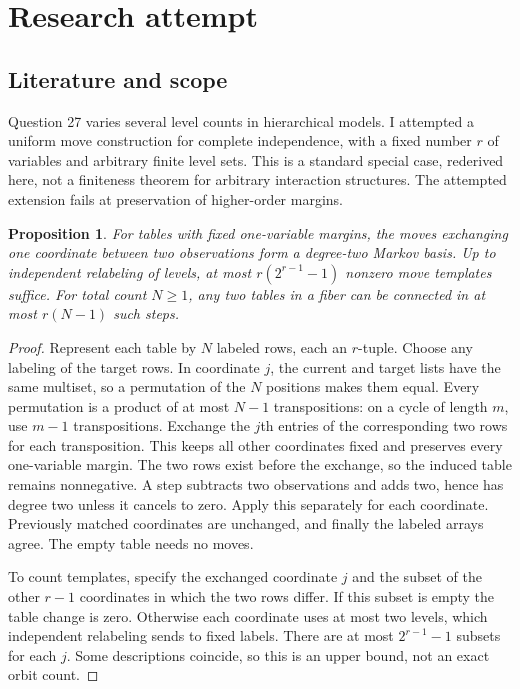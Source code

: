 \documentclass[11pt]{article}
\newtheorem{proposition}{Proposition}
\begin{document}
\section{Research attempt}
\subsection{Literature and scope}
Question 27 varies several level counts in hierarchical models. I attempted a uniform move construction for complete independence, with a fixed number $r$ of variables and arbitrary finite level sets. This is a standard special case, rederived here, not a finiteness theorem for arbitrary interaction structures. The attempted extension fails at preservation of higher-order margins.
\begin{proposition}
For tables with fixed one-variable margins, the moves exchanging one coordinate between two observations form a degree-two Markov basis. Up to independent relabeling of levels, at most $r(2^{r-1}-1)$ nonzero move templates suffice. For total count $N\ge1$, any two tables in a fiber can be connected in at most $r(N-1)$ such steps.
\end{proposition}
\begin{proof}
Represent each table by $N$ labeled rows, each an $r$-tuple. Choose any labeling of the target rows. In coordinate $j$, the current and target lists have the same multiset, so a permutation of the $N$ positions makes them equal. Every permutation is a product of at most $N-1$ transpositions: on a cycle of length $m$, use $m-1$ transpositions. Exchange the $j$th entries of the corresponding two rows for each transposition. This keeps all other coordinates fixed and preserves every one-variable margin. The two rows exist before the exchange, so the induced table remains nonnegative. A step subtracts two observations and adds two, hence has degree two unless it cancels to zero. Apply this separately for each coordinate. Previously matched coordinates are unchanged, and finally the labeled arrays agree. The empty table needs no moves.

To count templates, specify the exchanged coordinate $j$ and the subset of the other $r-1$ coordinates in which the two rows differ. If this subset is empty the table change is zero. Otherwise each coordinate uses at most two levels, which independent relabeling sends to fixed labels. There are at most $2^{r-1}-1$ subsets for each $j$. Some descriptions coincide, so this is an upper bound, not an exact orbit count.
\end{proof}
\end{document}
